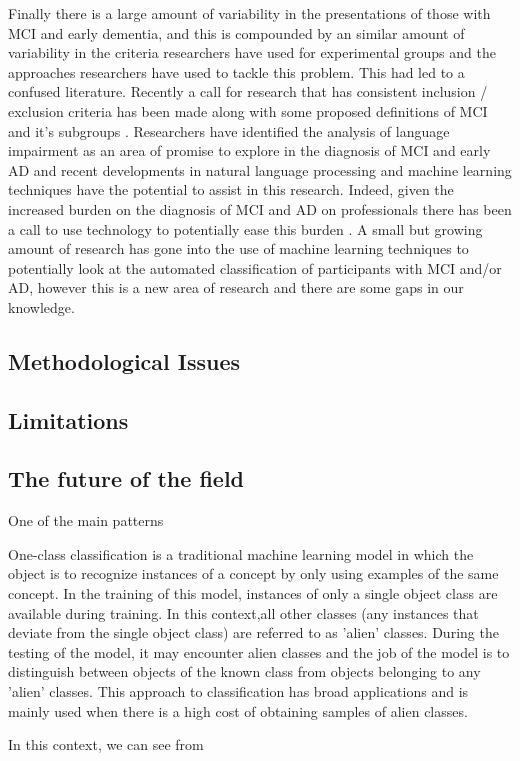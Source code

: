 \documentclass[10pt, letterpaper, twoside, openany]{thesis}
\begin{document}
Finally there is a large amount of variability in the presentations of those with MCI and early dementia, and this is compounded by an similar amount of variability in the criteria researchers have used for experimental groups and the approaches researchers have used to tackle this problem. This had led to a confused literature. Recently a call for research that has consistent inclusion / exclusion criteria has been made along with some proposed definitions of MCI and it's subgroups \cite{Petersen2014}. Researchers have identified the analysis of language impairment as an area of promise to explore in the diagnosis of MCI and early AD and recent developments in natural language processing and machine learning techniques have the potential to assist in this research. Indeed, given the increased burden on the diagnosis of MCI and AD on professionals there has been a call to use technology to potentially ease this burden \cite{Boschi2017}. A small but growing amount of research has gone into the use of machine learning techniques to potentially look at the automated classification of participants with MCI and/or AD, however this is a new area of research and there are some gaps in our knowledge.

\subsection{Methodological Issues}
\subsection{Limitations}

\subsection{The future of the field}
One of the main patterns 

One-class classification is a traditional machine learning model in which the object is to recognize instances of a concept by only using examples of the same concept. In the training of this model, instances of only a single object class are available during training. In this context,all other classes (any instances that deviate from the single object class) are referred to as 'alien' classes. During the testing of the model, it may encounter alien classes and the job of the model is to distinguish between objects of the known class from objects belonging to any 'alien' classes. This approach to classification has broad applications and is mainly used when there is a high cost of obtaining samples of alien classes.
\par 
In this context, we can see from 
\end{document}
